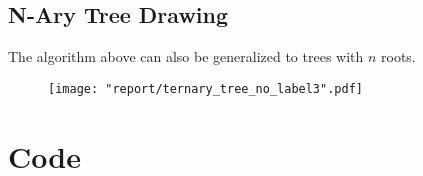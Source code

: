 \documentclass[11pt]{article}
\begin{document}
\pagebreak

\subsection*{N-Ary Tree Drawing}
The algorithm above can also be generalized to trees with $n$ roots.

\begin{figure}[H]
    \texttt{[image: "report/ternary\_tree\_no\_label3".pdf]}
\end{figure}

\pagebreak

\section*{Code}

\end{document}
